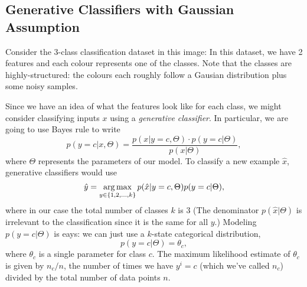 \documentclass{article}
\begin{document}
\subsection{Generative Classifiers with Gaussian Assumption}

Consider the 3-class classification dataset in this image:
In this dataset, we have 2 features and each colour represents one of the classes. Note that the classes are highly-structured: the colours each roughly follow a Gausian distribution plus some noisy samples.

Since we have an idea of what the features look like for each class, we might consider classifying  inputs $x$ using a \emph{generative classifier}. In particular, we are going to use Bayes rule to write
\[
p(y=c|x,\Theta) = \frac{p(x| y=c, \Theta) \cdot p(y=c|\Theta)}{p(x|\Theta)},
\]
where $\Theta$ represents the parameters of our model. To classify a new example $\hat{x}$, generative classifiers would use
\[
\hat{y} = \mathop{\rm arg\,max}_{y \in \{1,2,\dots,k\}} p(\hat{x}| y=c,\Theta)p(y=c|\Theta),
\]
where in our case the total number of classes $k$ is $3$ (The denominator $p(\hat{x}|\Theta)$ is irrelevant to the classification since it is the same for all $y$.)
Modeling $p(y=c|\Theta)$ is eays: we can just use a $k$-state categorical distribution,
\[
p(y = c | \Theta) = \theta_c,
\]
where $\theta_c$ is a single parameter for class $c$. The maximum likelihood estimate of $\theta_c$ is given by $n_c/n$, the number of times we have $y^i = c$ (which we've called $n_c$) divided by the total number of data points $n$.
\end{document}
